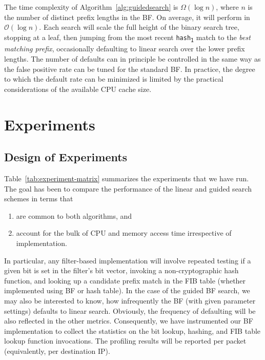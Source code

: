 \documentclass[conference,compsoc]{IEEEtran}
\begin{document}
The time
complexity of Algorithm~\ref{alg:guidedsearch} is $\Omega(\log n)$, 
where $n$ is the number of distinct prefix lengths in the BF.
On average, it will perform in $\mathcal{O}(\log n)$. Each
search will scale the full height of the binary search tree, stopping at
a leaf, then jumping from the most recent \texttt{hash\textsubscript{1}} match
to the \emph{best matching prefix}, occasionally defaulting to linear
search over the lower prefix lengths. The number of defaults can in 
principle be controlled in the same
way as the false positive rate can be tuned for the standard BF.
In practice, the degree to which the default rate can be minimized is
limited by the practical considerations of the available CPU cache size.

\section{Experiments}

\subsection{Design of Experiments}

Table~\ref{tab:experiment-matrix} summarizes the experiments that we have
run. The goal has been to compare the performance of the linear and guided 
search schemes in terms that

\begin{enumerate}[label=(\alph*)]
\item are common to both algorithms, and
\item account for the bulk of CPU and memory access time irrespective of implementation.
\end{enumerate}

In particular, any filter-based implementation will involve repeated testing
if a given bit is set in the filter's bit vector, invoking a
non-cryptographic hash function, and looking up a candidate prefix match in
the FIB table (whether implemented using BF or hash table). In the case
of the guided BF search, we may also be interested to know, how infrequently
the BF (with given parameter settings) defaults to linear search. Obviously,
the frequency of defaulting will be also reflected in the other metrics. 
Consequently, we have instrumented our BF implementation to collect the 
statistics on
the bit lookup, hashing, and FIB table lookup
function invocations. The profiling results will be reported per packet
(equivalently, per destination IP).
\end{document}
